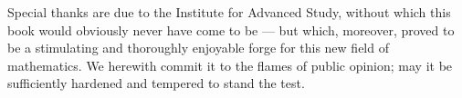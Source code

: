 {Special thanks are due to the Institute for Advanced Study, without which this book would obviously never have come to be --- but which, moreover, proved to be a stimulating and thoroughly enjoyable forge for this new field of mathematics.  We herewith commit it to the flames of public opinion; may it be sufficiently hardened and tempered to stand the test. 

\bigskip



}

